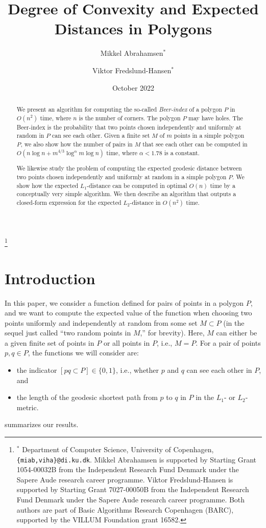 \documentclass{article}
\title{Degree of Convexity and Expected Distances in Polygons}
\author{Mikkel Abrahamsen$^\ast$ \and Viktor Fredslund-Hansen$^\ast$}
\date{October 2022}
\newcommand\blfootnote[1]{%
  \begingroup
  \renewcommand\thefootnote{}\footnote{#1}%
  \addtocounter{footnote}{-1}%
  \endgroup
}
\begin{document}
\maketitle

\blfootnote{
$^\ast$ Department of Computer Science, University of Copenhagen, \texttt{\{miab,viha\}@di.ku.dk}.
Mikkel Abrahamsen is supported by Starting Grant 1054-00032B from the Independent Research Fund Denmark under the Sapere Aude research career programme.
Viktor Fredslund-Hansen is supported by Starting Grant 7027-00050B from the
Independent Research Fund Denmark under the Sapere Aude research career programme.
Both authors are part of Basic Algorithms Research Copenhagen (BARC), supported by the VILLUM Foundation grant 16582.
}


\begin{abstract}
We present an algorithm for computing the so-called \emph{Beer-index} of a polygon $P$ in $O(n^2)$ time, where $n$ is the number of corners.
The polygon $P$ may have holes.
The Beer-index is the probability that two points chosen independently and uniformly at random in $P$ can see each other.
Given a finite set $M$ of $m$ points in a simple polygon $P$, we also show how the number of pairs in $M$ that see each other can be computed in
$O(n\log n+m^{4/3}\log^\alpha m\log n)$
time, where $\alpha<1.78$ is a constant.

We likewise study the problem of computing the expected geodesic distance between two points chosen independently and uniformly at random in a simple polygon $P$.
We show how the expected $L_1$-distance can be computed in optimal $O(n)$ time by a conceptually very simple algorithm.
We then describe an algorithm that outputs a closed-form expression for the expected $L_2$-distance in $O(n^2)$ time.
\end{abstract}

\section{Introduction}

In this paper, we consider a function defined for pairs of points in a polygon $P$, and we want to compute the expected value of the function when choosing two points uniformly and independently at random from some set $M\subset P$ (in the sequel just called ``two random points in $M$,'' for brevity).
Here, $M$ can either be a given finite set of points in $P$ or all points in $P$, i.e., $M=P$.
For a pair of points $p,q\in P$, the functions we will consider are:
\begin{itemize}
\item the indicator $[pq\subset P]\in\{0,1\}$, i.e., whether $p$ and $q$ can see each other in $P$, and
\item the length of the geodesic shortest path from $p$ to $q$ in $P$ in the $L_1$- or $L_2$-metric.
\end{itemize}
 summarizes our results.
\end{document}
